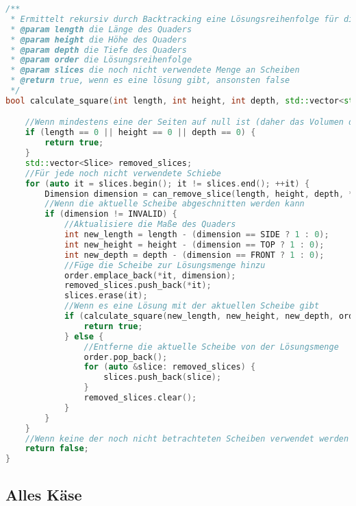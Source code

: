 \documentclass[a4paper,10pt,ngerman]{scrartcl}
\begin{document}
    \newpage

    \begin{lstlisting}[frame=single,language=C++,title=Methode calculate\_square,breaklines=true,label={lst:code_calculateSquare}]
/**
 * Ermittelt rekursiv durch Backtracking eine Lösungsreihenfolge für die gegebene Menge an Scheiben.
 * @param length die Länge des Quaders
 * @param height die Höhe des Quaders
 * @param depth die Tiefe des Quaders
 * @param order die Lösungsreihenfolge
 * @param slices die noch nicht verwendete Menge an Scheiben
 * @return true, wenn es eine lösung gibt, ansonsten false
 */
bool calculate_square(int length, int height, int depth, std::vector<std::pair<Slice, Dimension>> &order, std::vector<Slice> &slices) {

    //Wenn mindestens eine der Seiten auf null ist (daher das Volumen des Quaders null ist)
    if (length == 0 || height == 0 || depth == 0) {
        return true;
    }
    std::vector<Slice> removed_slices;
    //Für jede noch nicht verwendete Schiebe
    for (auto it = slices.begin(); it != slices.end(); ++it) {
        Dimension dimension = can_remove_slice(length, height, depth, *it);
        //Wenn die aktuelle Scheibe abgeschnitten werden kann
        if (dimension != INVALID) {
            //Aktualisiere die Maße des Quaders
            int new_length = length - (dimension == SIDE ? 1 : 0);
            int new_height = height - (dimension == TOP ? 1 : 0);
            int new_depth = depth - (dimension == FRONT ? 1 : 0);
            //Füge die Scheibe zur Lösungsmenge hinzu
            order.emplace_back(*it, dimension);
            removed_slices.push_back(*it);
            slices.erase(it);
            //Wenn es eine Lösung mit der aktuellen Scheibe gibt
            if (calculate_square(new_length, new_height, new_depth, order, slices)) {
                return true;
            } else {
                //Entferne die aktuelle Scheibe von der Lösungsmenge
                order.pop_back();
                for (auto &slice: removed_slices) {
                    slices.push_back(slice);
                }
                removed_slices.clear();
            }
        }
    }
    //Wenn keine der noch nicht betrachteten Scheiben verwendet werden kann
    return false;
}
    \end{lstlisting}

    \newpage

    \subsection{Alles Käse}\label{subsec:alles-kaese}
\end{document}
